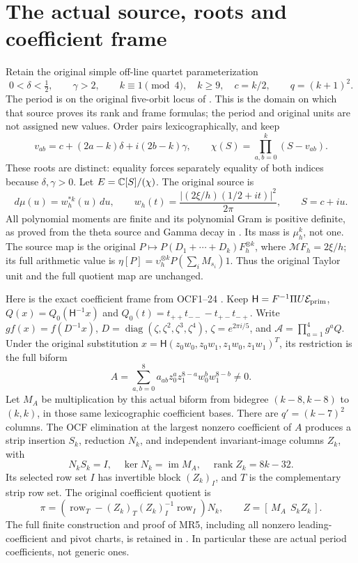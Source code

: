 \documentclass[11pt]{article}
\begin{document}
\section{The actual source, roots and coefficient frame}
Retain the original simple off-line quartet parameterization
\[
 0<\delta<\tfrac12,\qquad \gamma>2,\qquad
 k\equiv1\pmod4,\quad k\ge9,\quad c=k/2,
 \qquad q=(k+1)^2.
 \tag{MR1}
\]
The period is on the original five-orbit locus of \cite{mrroot:OCF}.
This is the domain on which that source proves its rank and frame
formulas; the period and original units are not assigned new values.
Order pairs lexicographically, and keep
\[
 v_{ab}=c+(2a-k)\delta+i(2b-k)\gamma,
 \qquad \chi(S)=\prod_{a,b=0}^k(S-v_{ab}).\tag{MR2}
\]
These roots are distinct: equality forces separately equality of both
indices because $\delta,\gamma>0$. Let $E=\mathbb C[S]/(\chi)$.
The original source is
\[
 d\mu(u)=w_h^{*k}(u)\,du,\qquad
 w_h(t)=\frac{|(2\xi/h)(1/2+it)|^2}{2\pi},\qquad S=c+iu.
 \tag{MR3}
\]
All polynomial moments are finite and its polynomial Gram is positive
definite, as proved from the theta source and Gamma decay in
\cite{mrroot:Toda,mrroot:Mixed}. Its mass is $\mu_h^k$, not one.
The source map is the original
$P\mapsto P(D_1+\cdots+D_k)F_h^{\otimes k}$, where
$\mathcal MF_h=2\xi/h$; its full arithmetic value is
$\eta[P]=\upsilon_h^{\otimes k}P(\sum_iM_{s_i})1$.
Thus the original Taylor unit and the full quotient map are unchanged.

Here is the exact coefficient frame from OCF1--24 \cite{mrroot:OCF}.
Keep $\mathsf H=F^{-1}\Pi U\mathcal E_{\rm prim}$,
$Q(x)=Q_0(\mathsf H^{-1}x)$ and
$Q_0(t)=t_{++}t_{--}-t_{+-}t_{-+}$.
Write $g f(x)=f(D^{-1}x)$,
$D=\operatorname{diag}(\zeta,\zeta^2,\zeta^3,\zeta^4)$,
$\zeta=e^{2\pi i/5}$, and $\mathcal A=\prod_{a=1}^4g^aQ$.
Under the original substitution
$x=\mathsf H(z_0w_0,z_0w_1,z_1w_0,z_1w_1)^T$, its restriction is the
full biform
\[
 A=\sum_{a,b=0}^8a_{ab}z_0^az_1^{8-a}w_0^bw_1^{8-b}\ne0.
 \tag{MR4}
\]
Let $M_A$ be multiplication by this actual biform from bidegree
$(k-8,k-8)$ to $(k,k)$, in those same lexicographic coefficient bases.
There are $q'=(k-7)^2$ columns. The OCF elimination at the largest
nonzero coefficient of $A$ produces a strip insertion $S_k$, reduction
$N_k$, and independent invariant-image columns $Z_k$, with
\[
 N_kS_k=I,\quad \ker N_k=\operatorname{im}M_A,\quad
 \operatorname{rank}Z_k=8k-32.\tag{MR5}
\]
Its selected row set $I$ has invertible block $(Z_k)_I$, and $T$ is
the complementary strip row set. The original coefficient quotient is
\[
 \pi=(\operatorname{row}_T-(Z_k)_T(Z_k)_I^{-1}
                   \operatorname{row}_I)N_k,
 \qquad Z=[\,M_A\ \ S_kZ_k\,].\tag{MR6}
\]
The full finite construction and proof of MR5, including all nonzero
leading-coefficient and pivot charts, is retained in \cite{mrroot:OCF}.
In particular these are actual period coefficients, not generic ones.
\end{document}
